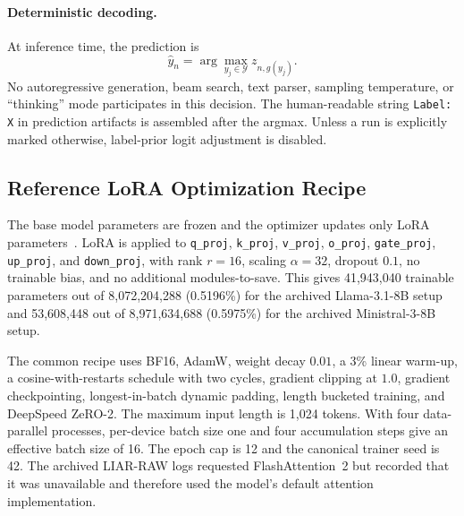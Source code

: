 \paragraph{Deterministic decoding.}
At inference time, the prediction is
\begin{equation}
\widehat{y}_n
=
\arg\max_{y_j\in\mathcal{Y}}z_{n,g(y_j)}.
\label{eq:supp-label-argmax}
\end{equation}
No autoregressive generation, beam search, text parser, sampling
temperature, or ``thinking'' mode participates in this decision.  The
human-readable string \texttt{Label: X} in prediction artifacts is
assembled after the argmax.  Unless a run is explicitly marked otherwise,
label-prior logit adjustment is disabled.

\subsection{Reference LoRA Optimization Recipe}
\label{sec:supp-lora-recipe}

The base model parameters are frozen and the optimizer updates only LoRA
parameters~\citep{Hu2022LoRA}.  LoRA is applied to
\texttt{q\_proj}, \texttt{k\_proj}, \texttt{v\_proj},
\texttt{o\_proj}, \texttt{gate\_proj}, \texttt{up\_proj}, and
\texttt{down\_proj}, with rank $r=16$, scaling $\alpha=32$, dropout
$0.1$, no trainable bias, and no additional modules-to-save.  This gives
41,943,040 trainable parameters out of 8,072,204,288 (0.5196\%) for the
archived Llama-3.1-8B setup and 53,608,448 out of 8,971,634,688
(0.5975\%) for the archived Ministral-3-8B setup.

The common recipe uses BF16, AdamW, weight decay $0.01$, a 3\% linear
warm-up, a cosine-with-restarts schedule with two cycles, gradient clipping
at $1.0$, gradient checkpointing, longest-in-batch dynamic padding, length
bucketed training, and DeepSpeed ZeRO-2.  The maximum input length is
1,024 tokens.  With four data-parallel processes, per-device batch size
one and four accumulation steps give an effective batch size of 16.
The epoch cap is 12 and the canonical trainer seed is 42.  The archived
LIAR-RAW logs requested FlashAttention~2 but recorded that it was
unavailable and therefore used the model's default attention
implementation.

